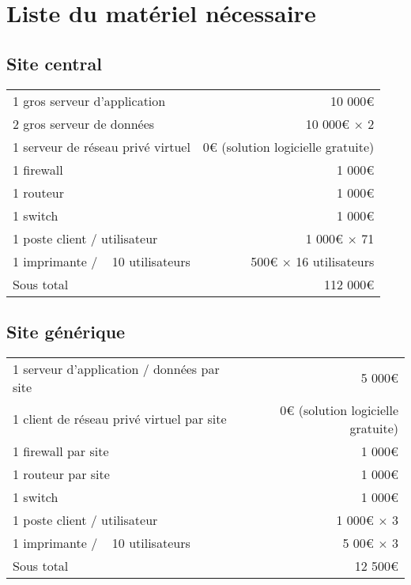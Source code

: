 \section{Liste du matériel nécessaire}
    \subsection{Site central}
        \begin{tabular*}{\textwidth}{ l @{\extracolsep{\fill}} r }
	        1 gros serveur d'application        & 10 000€ \\ 
	        2 gros serveur de données           & 10 000€ $\times$ 2 \\ 
	        1 serveur de réseau privé virtuel   & 0€ (solution logicielle gratuite)\\ 
            1 firewall                          & 1 000€ \\ 
	        1 routeur                           & 1 000€ \\ 
	        1 switch                            & 1 000€ \\ 
	        1 poste client / utilisateur        & 1 000€ $\times$ 71\\
	        1 imprimante / ~ 10 utilisateurs    & 500€ $\times$ 16 utilisateurs\\ \hline
	        Sous total                          & 112 000€
        \end{tabular*}
        
    \subsection{Site générique}
        \begin{tabular*}{\textwidth}{ l @{\extracolsep{\fill}} r }
	        1 serveur d'application / données par site  & 5 000€ \\ 
	        1 client de réseau privé virtuel par site   & 0€ (solution logicielle gratuite)\\ 
            1 firewall par site                         & 1 000€ \\ 
	        1 routeur par site                          & 1 000€ \\ 
	        1 switch                                    & 1 000€ \\ 
	        1 poste client / utilisateur                & 1 000€ $\times$ 3 \\
	        1 imprimante / ~ 10 utilisateurs            & 5 00€ $\times$ 3 \\ \hline
	        Sous total                                  & 12 500€
        \end{tabular*}

